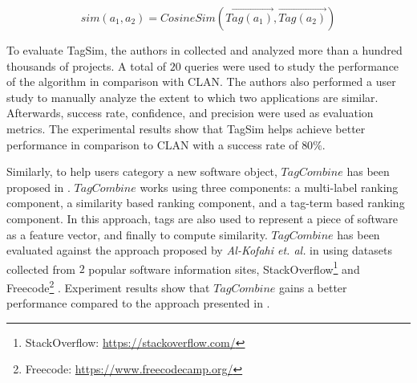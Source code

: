 \begin{equation}
sim(a_{1},a_{2})= CosineSim(\vec{Tag(a_{1})},\vec{Tag(a_{2})})
\end{equation}

To evaluate TagSim, the authors in \cite{Lo:2012:DSA:2473496.2473616} collected and analyzed more than a hundred thousands of projects. A total of $20$ queries were used to study the performance of the algorithm in comparison with CLAN. The authors also performed a user study to manually analyze the extent to which two applications are similar. Afterwards, success rate, confidence, and precision were used as evaluation metrics. The experimental results show that TagSim helps achieve better performance in comparison to CLAN with a success rate of $80\%$.

Similarly, to help users category a new software object, $TagCombine$ has been proposed in \cite{xia:tag:2013}. $TagCombine$ works using three components: a multi-label ranking component, a similarity based ranking component, and a tag-term based ranking component. In this approach, tags are also used to represent a piece of software as a feature vector, and finally to compute similarity. $TagCombine$ has been evaluated against the approach proposed by \emph{Al-Kofahi et. al.} in \cite{Al-Kofahi:2010:FSA:1912607.1913281} using datasets collected from $2$ popular software information sites, StackOverflow\footnote{StackOverflow: \url{https://stackoverflow.com/}} and Freecode\footnote{Freecode: \url{https://www.freecodecamp.org/}} \cite{xia:tag:2013}. Experiment results show that $TagCombine$ gains a better performance compared to the approach presented in \cite{Al-Kofahi:2010:FSA:1912607.1913281}. 







